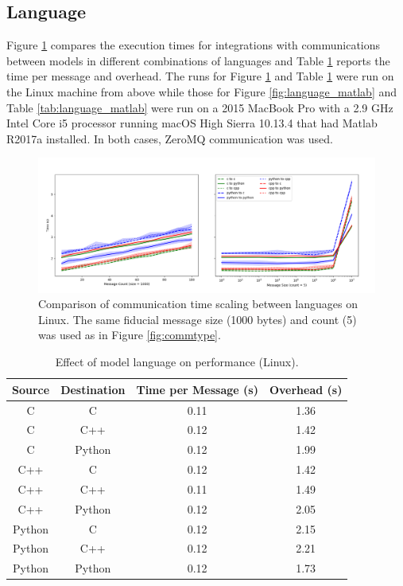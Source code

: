 \documentclass[journal]{IEEEtran}
\begin{document}
\subsection{Language}\label{SS:results_language}
%
Figure \ref{fig:language} compares the execution times for integrations with communications between models in different combinations of languages and Table \ref{tab:language} reports the time per message and overhead. The runs for Figure \ref{fig:language} and Table \ref{tab:language} were run on the Linux machine from above while those for Figure \ref{fig:language_matlab} and Table \ref{tab:language_matlab} were run on a 2015 MacBook Pro with a 2.9 GHz Intel Core i5 processor running macOS High Sierra 10.13.4 that had Matlab R2017a installed. In both cases, ZeroMQ communication was used. 
%
\ifinclfig
 	\begin{figure}[htbp]
	\begin{center}
	\includegraphics[width=\columnwidth,keepaspectratio]{./images/scaling_language.png}
	\caption{Comparison of communication time scaling between languages on Linux. The same fiducial message size (1000 bytes) and count (5) was used as in Figure \ref{fig:commtype}.}
	\label{fig:language}
	\end{center}
	\end{figure}
\fi
%
\begin{table}[htbp]
\begin{center}
\begin{tabular}{|c|c|c|c|}
\hline
Source 	& Destination 	& Time per Message (s) 	& Overhead (s) 	\\\hline
C 				& C					& 0.11				& 1.36			\\
C 				& C++				& 0.12				& 1.42			\\
C 				& Python				& 0.12				& 1.99			\\
\hline%
C++ 				& C					& 0.12				& 1.42			\\
C++ 				& C++				& 0.11				& 1.49			\\
C++ 				& Python				& 0.12				& 2.05			\\
\hline%
Python			& C					& 0.12				& 2.15			\\
Python			& C++				& 0.12				& 2.21			\\
Python			& Python				& 0.12				& 1.73			\\
\hline
\end{tabular}
\end{center}
\caption{Effect of model language on performance (Linux).}
\label{tab:language}
\end{table}%
\end{document}
